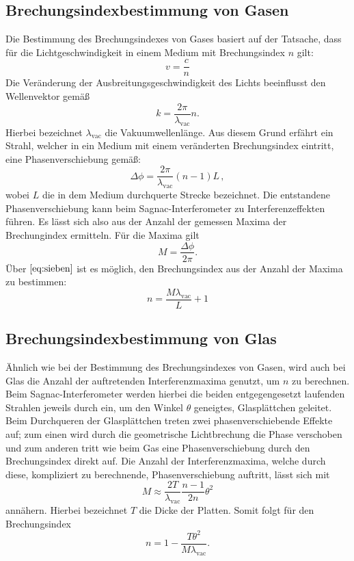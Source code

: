 \subsection{Brechungsindexbestimmung von Gasen}
Die Bestimmung des Brechungsindexes von Gases basiert auf der Tatsache, dass für die Lichtgeschwindigkeit in einem Medium mit Brechungsindex $n$ gilt:
\begin{equation}
  v=\frac{c}{n}
\end{equation}
Die Veränderung der Ausbreitungsgeschwindigkeit des Lichts beeinflusst den Wellenvektor gemäß
\begin{equation}
  k = \frac{2\pi}{\lambda_{\text{vac}}}n.
\end{equation}
Hierbei bezeichnet $\lambda_{\text{vac}}$ die Vakuumwellenlänge.
Aus diesem Grund erfährt ein Strahl, welcher in ein Medium mit einem veränderten Brechungsindex eintritt, eine Phasenverschiebung gemäß:
\begin{equation}
  \Delta \phi= \frac{2\pi}{\lambda_{\text{vac}}}(n-1)L \, ,
  \label{eq:sieben}
\end{equation}
wobei  $L$ die in dem Medium durchquerte Strecke bezeichnet. Die entstandene Phasenverschiebung kann beim Sagnac-Interferometer zu Interferenzeffekten führen. Es lässt sich also
aus der Anzahl der gemessen Maxima der Brechungindex ermitteln. Für die Maxima gilt
\begin{equation}
  M = \frac{\Delta \phi}{2 \pi}.
\end{equation}
Über $\ref{eq:sieben}$ ist es möglich, den Brechungsindex aus der Anzahl der Maxima zu bestimmen:
\begin{equation}
  n=\frac{M\lambda_{\text{vac}}}{L}+1
\end{equation}
\subsection{Brechungsindexbestimmung von Glas}
Ähnlich wie bei der Bestimmung des Brechungsindexes von Gasen, wird auch bei Glas die Anzahl der auftretenden Interferenzmaxima genutzt, um $n$ zu berechnen. Beim Sagnac-Interferometer
werden hierbei die beiden entgegengesetzt laufenden Strahlen jeweils durch ein, um den Winkel $\theta$ geneigtes, Glasplättchen geleitet. Beim Durchqueren
der Glasplättchen treten zwei phasenverschiebende Effekte auf; zum einen wird durch die geometrische Lichtbrechung die Phase verschoben und zum anderen tritt wie beim
Gas eine Phasenverschiebung durch den Brechungsindex direkt auf.
Die Anzahl der Interferenzmaxima, welche durch diese, kompliziert zu berechnende, Phasenverschiebung auftritt, lässt  sich mit
\begin{equation}
  M \approx \frac{2T}{\lambda_{\text{vac}}}\frac{n-1}{2n}\theta^2
\end{equation}
annähern. Hierbei bezeichnet $T$ die Dicke der Platten. Somit folgt für den Brechungsindex
\begin{equation}
  n=1-\frac{T\theta^2}{M\lambda_{\text{vac}}}.
\end{equation}
